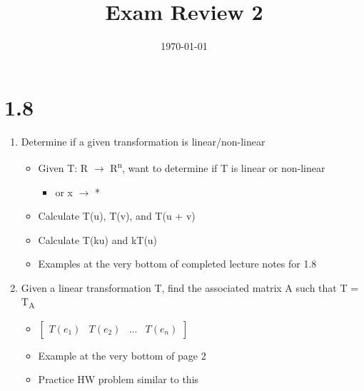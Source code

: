 \documentclass[letterpaper, 12pt]{article}
\date{\today}
\title{Exam Review 2}
\begin{document}
\maketitle
\section{1.8}
\label{sec:org43b0f7c}
\begin{enumerate}
\item Determine if a given transformation is linear/non-linear\\
\begin{itemize}
\item Given T: R \(\rightarrow\) R\textsuperscript{n}, want to determine if T is linear or non-linear\\
\begin{itemize}
\item or x \(\rightarrow\) *\\
\end{itemize}
\item Calculate T(u), T(v), and T(u + v)\\
\item Calculate T(ku) and kT(u)\\
\item Examples at the very bottom of completed lecture notes for 1.8\\
\end{itemize}
\item Given a linear transformation T, find the associated matrix A such that T = T\textsubscript{A}\\
\begin{itemize}
\item \(\begin{bmatrix}T(e_1)&T(e_2)&...&T(e_n)\end{bmatrix}\)\\
\item Example at the very bottom of page 2\\
\item Practice HW problem similar to this\\
\end{itemize}
\end{enumerate}
\end{document}
